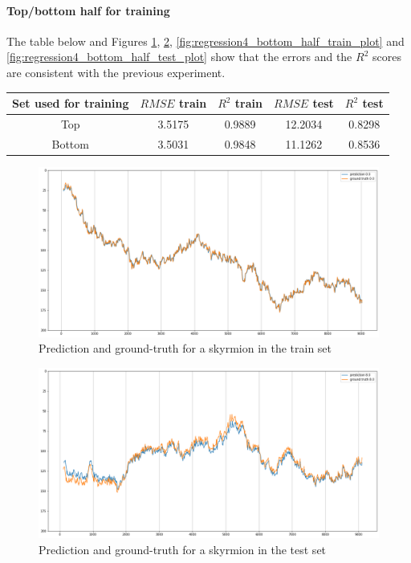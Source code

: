 \documentclass[a4paper]{article}
\begin{document}
  \paragraph{Top/bottom half for training}

  The table below and Figures \ref{fig:regression4_top_half_train_plot}, \ref{fig:regression4_top_half_test_plot}, \ref{fig:regression4_bottom_half_train_plot} and \ref{fig:regression4_bottom_half_test_plot} show that the errors and the $R^2$ scores are consistent with the previous experiment.

  \begin{table}[h!]
    \centering
    \begin{tabular}{|c|c c|c c|} 
     \hline
     Set used for training & $RMSE$ train & $R^2$ train & $RMSE$ test & $R^2$ test\\ [0.5ex] 
     \hline\hline
     Top & 3.5175 & 0.9889 & 12.2034 & 0.8298 \\ 
     Bottom & 3.5031 & 0.9848 & 11.1262 & 0.8536 \\
     \hline
    \end{tabular}
  \end{table}

  \begin{figure}
    \centering
    \includegraphics[width=\textwidth]{regression4_top_half_train_plot.png}
    \caption{Prediction and ground-truth for a skyrmion in the train set}
    \label{fig:regression4_top_half_train_plot}
  \end{figure}

  \begin{figure}
    \centering
    \includegraphics[width=\textwidth]{regression4_top_half_test_plot.png}
    \caption{Prediction and ground-truth for a skyrmion in the test set}
    \label{fig:regression4_top_half_test_plot}
  \end{figure}
\end{document}
